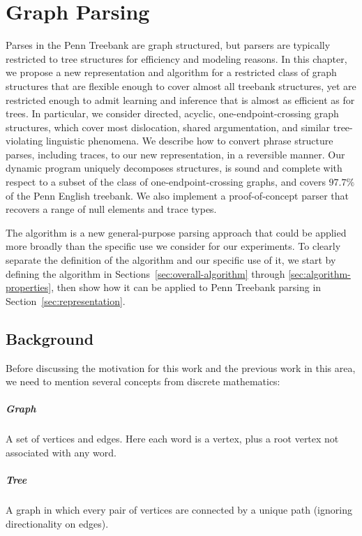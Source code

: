 \chapter{Graph Parsing} \label{chp:parsing}

Parses in the Penn Treebank \parencite{ptb} are graph structured, but parsers are typically restricted to tree structures for efficiency and modeling reasons.
In this chapter, we propose a new representation and algorithm for a restricted class of graph structures that are flexible enough to cover almost all treebank structures, yet are restricted enough to admit learning and inference that is almost as efficient as for trees.
In particular, we consider directed, acyclic, one-endpoint-crossing graph structures, which cover most dislocation, shared argumentation, and similar tree-violating linguistic phenomena.
We describe how to convert phrase structure parses, including traces, to our new representation, in a reversible manner.
Our dynamic program uniquely decomposes structures, is sound and complete with respect to a subset of the class of one-endpoint-crossing graphs, and covers $97.7\%$ of the Penn English treebank.
We also implement a proof-of-concept parser that recovers a range of null elements and trace types.

The algorithm is a new general-purpose parsing approach that could be applied more broadly than the specific use we consider for our experiments.
To clearly separate the definition of the algorithm and our specific use of it, we start by defining the algorithm in Sections~\ref{sec:overall-algorithm} through \ref{sec:algorithm-properties}, then show how it can be applied to Penn Treebank parsing in Section~\ref{sec:representation}.

\section{Background}

Before discussing the motivation for this work and the previous work in this area, we need to mention several concepts from discrete mathematics:

\paragraph{Graph}
A set of vertices and edges.
Here each word is a vertex, plus a root vertex not associated with any word.

\paragraph{Tree}
A graph in which every pair of vertices are connected by a unique path (ignoring directionality on edges).

